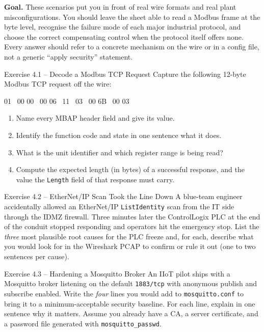\documentclass[11pt,a4paper]{article}
\begin{document}
\sheetheader

\noindent\textbf{Goal.}
These scenarios put you in front of real wire formats and real plant misconfigurations.
You should leave the sheet able to read a Modbus frame at the byte level, recognise the
failure mode of each major industrial protocol, and choose the correct compensating
control when the protocol itself offers none. Every answer should refer to a concrete
mechanism on the wire or in a config file, not a generic ``apply security'' statement.

\vspace{0.6em}

\begin{taskbox}{Exercise 4.1 -- Decode a Modbus TCP Request}
Capture the following 12-byte Modbus TCP request off the wire:
\begin{center} 01 \ 00 00 \ 00 06 \ 11 \ 03 \ 00 6B \ 00 03
\end{center}
\begin{enumerate}
  \item Name every MBAP header field and give its value.
  \item Identify the function code and state in one sentence what it does.
  \item What is the unit identifier and which register range is being read?
  \item Compute the expected length (in bytes) of a successful response,
        and the value the \texttt{Length} field of that response must carry.
\end{enumerate}
\end{taskbox}

\begin{taskbox}{Exercise 4.2 -- EtherNet/IP Scan Took the Line Down}
A blue-team engineer accidentally allowed an EtherNet/IP \texttt{ListIdentity}
scan from the IT side through the IDMZ firewall. Three minutes later the
ControlLogix PLC at the end of the conduit stopped responding and operators
hit the emergency stop. List the \emph{three} most plausible root causes for
the PLC freeze and, for each, describe what you would look for in the
Wireshark PCAP to confirm or rule it out (one to two sentences per cause).
\end{taskbox}

\begin{taskbox}{Exercise 4.3 -- Hardening a Mosquitto Broker}
An IIoT pilot ships with a Mosquitto broker listening on the default
\texttt{1883/tcp} with anonymous publish and subscribe enabled. Write the
\emph{four} lines you would add to \texttt{mosquitto.conf} to bring it to a
minimum-acceptable security baseline. For each line, explain in one sentence
why it matters. Assume you already have a CA, a server certificate, and a
password file generated with \texttt{mosquitto\_passwd}.
\end{taskbox}
\end{document}
